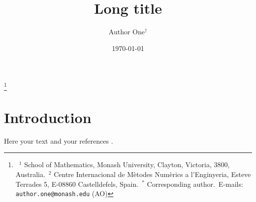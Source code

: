 \documentclass[oneside,reqno,12pt,a4paper]{amsart}
\begin{document}
\title[Short title]{Long title}

\author[A. One]{Author One$^\dagger$}
\thanks{\null\
$^{1}$ School of Mathematics, Monash University, Clayton, Victoria, 3800, Australia.\
$^{2}$ Centre Internacional de M\`etodes Num\`erics a l'Enginyeria, Esteve Terrades 5, E-08860 Castelldefels, Spain.\
$^*$ Corresponding author.\
E-mails: {\tt author.one@monash.edu} (AO) 
}
\date{\today}

\begin{abstract}
\end{abstract}

\maketitle
 
\section{Introduction}
\label{Sec:introduction}
% 

Here your text and your references \cite{2106.13728,2102.11802,10.21105_joss.02520,10.1016_0021-9991_80_90005-4}.

\printbibliography
\end{document}
